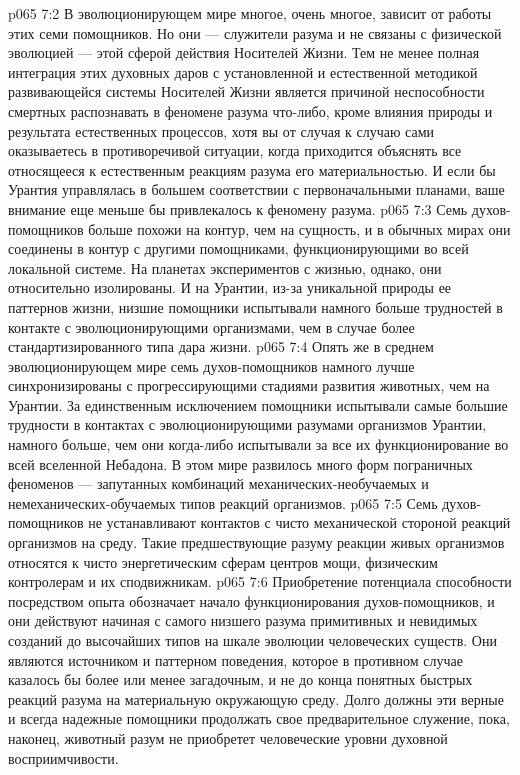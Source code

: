 \vs p065 7:2 В эволюционирующем мире многое, очень многое, зависит от работы этих семи помощников. Но они --- служители разума и не связаны с физической эволюцией --- этой сферой действия Носителей Жизни. Тем не менее полная интеграция этих духовных даров с установленной и естественной методикой развивающейся системы Носителей Жизни является причиной неспособности смертных распознавать в феномене разума что\hyp{}либо, кроме влияния природы и результата естественных процессов, хотя вы от случая к случаю сами оказываетесь в противоречивой ситуации, когда приходится объяснять все относящееся к естественным реакциям разума его материальностью. И если бы Урантия управлялась в большем соответствии с первоначальными планами, ваше внимание еще меньше бы привлекалось к феномену разума.
\vs p065 7:3 Семь духов\hyp{}помощников больше похожи на контур, чем на сущность, и в обычных мирах они соединены в контур с другими помощниками, функционирующими во всей локальной системе. На планетах экспериментов с жизнью, однако, они относительно изолированы. И на Урантии, из\hyp{}за уникальной природы ее паттернов жизни, низшие помощники испытывали намного больше трудностей в контакте с эволюционирующими организмами, чем в случае более стандартизированного типа дара жизни.
\vs p065 7:4 Опять же в среднем эволюционирующем мире семь духов\hyp{}помощников намного лучше синхронизированы с прогрессирующими стадиями развития животных, чем на Урантии. За единственным исключением помощники испытывали самые большие трудности в контактах с эволюционирующими разумами организмов Урантии, намного больше, чем они когда\hyp{}либо испытывали за все их функционирование во всей вселенной Небадона. В этом мире развилось много форм пограничных феноменов --- запутанных комбинаций механических\hyp{}необучаемых и немеханических\hyp{}обучаемых типов реакций организмов.
\vs p065 7:5 Семь духов\hyp{}помощников не устанавливают контактов с чисто механической стороной реакций организмов на среду. Такие предшествующие разуму реакции живых организмов относятся к чисто энергетическим сферам центров мощи, физическим контролерам и их сподвижникам.
\vs p065 7:6 Приобретение потенциала способности  посредством опыта обозначает начало функционирования духов\hyp{}помощников, и они действуют начиная с самого низшего разума примитивных и невидимых созданий до высочайших типов на шкале эволюции человеческих существ. Они являются источником и паттерном поведения, которое в противном случае казалось бы более или менее загадочным, и не до конца понятных быстрых реакций разума на материальную окружающую среду. Долго должны эти верные и всегда надежные помощники продолжать свое предварительное служение, пока, наконец, животный разум не приобретет человеческие уровни духовной восприимчивости.
